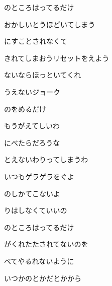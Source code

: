 \documentclass[a4paper,tate,twocolumn,12pt]{ltjtarticle}
\begin{document}
\begin{flushleft}
\begin{minipage}{\linewidth}
のところはってるだけ
\end{minipage}

\vspace{2em}

\noindent\begin{minipage}{\linewidth}
おかしいとうほどいてしまう

にすことされなくて

きれてしまおうリセットをえよう

ないならほっといてくれ

うえないジョーク

のをめるだけ
\end{minipage}

\vspace{2em}

\noindent\begin{minipage}{\linewidth}
もうがえてしいわ

にべたらだろうな

とえないわりってしまうわ

いつもゲラゲラをぐよ

のしかてこないよ

りはしなくていいの

のところはってるだけ
\end{minipage}

\vspace{2em}

\noindent\begin{minipage}{\linewidth}
がくれたたされてないのを

べてやるれないように

いつかのとかだとかから


\end{minipage}
\end{flushleft}
\end{document}
